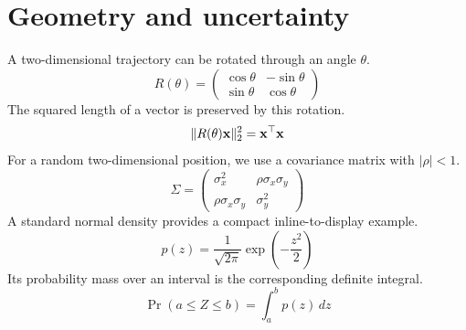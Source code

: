 \section{Geometry and uncertainty}
A two-dimensional trajectory can be rotated through an angle $\theta$.
\begin{equation}
  R(\theta) =
  \begin{pmatrix}
    \cos\theta & -\sin\theta \\
    \sin\theta & \cos\theta
  \end{pmatrix}
  \label{eq:rotation_matrix}
\end{equation}
The squared length of a vector is preserved by this rotation.
\begin{equation}
  \|R(\theta)\mathbf{x}\|_2^2 = \mathbf{x}^\top\mathbf{x}
  \label{eq:length_preservation}
\end{equation}
For a random two-dimensional position, we use a covariance matrix with $|\rho|<1$.
\begin{equation}
  \Sigma = \begin{pmatrix}
    \sigma_x^2 & \rho\sigma_x\sigma_y \\
    \rho\sigma_x\sigma_y & \sigma_y^2
  \end{pmatrix}
  \label{eq:position_covariance}
\end{equation}
A standard normal density provides a compact inline-to-display example.
\begin{equation}
  p(z) = \frac{1}{\sqrt{2\pi}}\exp\!\left(-\frac{z^2}{2}\right)
  \label{eq:normal_density}
\end{equation}
Its probability mass over an interval is the corresponding definite integral.
\begin{equation}
  \Pr(a\leq Z\leq b) = \int_a^b p(z)\,dz
  \label{eq:interval_probability}
\end{equation}
